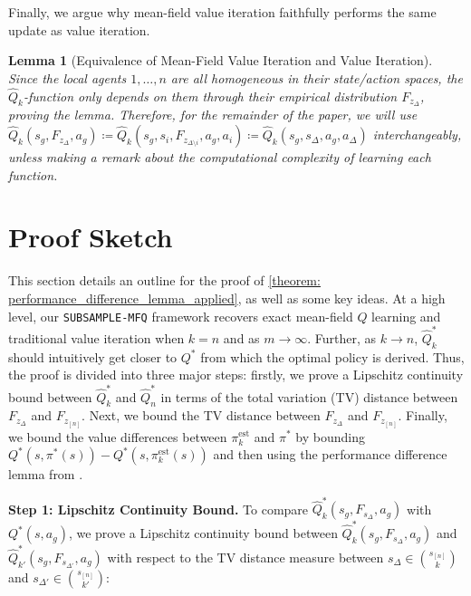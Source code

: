\documentclass{article}
\theoremstyle{plain}
\newtheorem{lemma}[theorem]{Lemma}
\theoremstyle{definition}
\def\est{\mathrm{est}}
\begin{document}
Finally, we argue why mean-field value iteration faithfully performs the same update as value iteration.
\begin{lemma}[Equivalence of Mean-Field Value Iteration and Value Iteration]
    \label{lemma: equivalent updates}
    \emph{Since the local agents $1,\dots,n$ are all homogeneous in their state/action spaces, the $\hat{Q}_k$-function only depends on them through their empirical distribution $F_{z_\Delta}$, proving the lemma. Therefore, for the remainder of the paper, we will use $\hat{Q}_k(s_g,F_{z_\Delta},a_g)\coloneq \hat{Q}_k(s_g,s_i,F_{z_{\Delta\setminus i}},a_g,a_i)\coloneq\hat{Q}_k(s_g,s_\Delta,a_g,a_\Delta)$ interchangeably, unless making a remark about the computational complexity of learning each function.}
\end{lemma}


\section{Proof Sketch}
\label{proof-sketch}
This section details an outline for the proof of \cref{theorem: performance_difference_lemma_applied}, as well as some key ideas. At a high level, our \texttt{SUBSAMPLE-MFQ} framework recovers exact mean-field $Q$ learning and traditional value iteration when $k=n$ and as $m\to\infty$. Further, as $k\!\to\!n$, $\hat{Q}_k^*$ should intuitively get closer to $Q^*$ from which the optimal policy is derived. Thus, the proof is divided into three major steps: firstly, we prove a Lipschitz continuity bound between $\hat{Q}_k^*$ and $\hat{Q}_n^*$ in terms of the total variation (TV) distance between $F_{z_\Delta}$ and $F_{z_{[n]}}$. Next, we bound the TV distance between $F_{z_\Delta}$ and $F_{z_{[n]}}$. Finally, we bound the value differences between ${\pi}_{k}^\est$ and $\pi^*$ by bounding $Q^*(s,\pi^*(s))-Q^*(s,{\pi}_{k}^\est(s))$ and then using the performance difference lemma from  \citet{Kakade+Langford:2002}.

\textbf{Step 1: Lipschitz Continuity Bound.}
To compare $\hat{Q}_k^*(s_g,F_{s_\Delta},a_g)$ with $Q^*(s,a_g)$, we prove a Lipschitz continuity bound between $\hat{Q}^*_k(s_g, F_{s_\Delta},a_g)$ and $\hat{Q}^*_{k'}(s_g, F_{s_{\Delta'}},a_g)$ with respect to the TV distance measure between $s_\Delta\in \binom{s_{[n]}}{k}$ and $s_{\Delta'}\in \binom{s_{[n]}}{k'}$:
\end{document}
